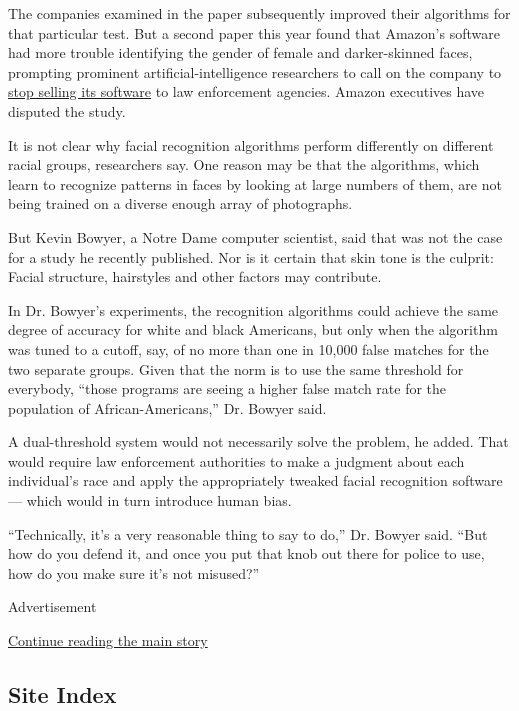 The companies examined in the paper subsequently improved their
algorithms for that particular test. But a second paper this year found
that Amazon's software had more trouble identifying the gender of female
and darker-skinned faces, prompting prominent artificial-intelligence
researchers to call on the company to
\href{https://www.nytimes.com/2019/04/03/technology/amazon-facial-recognition-technology.html}{stop
selling its software} to law enforcement agencies. Amazon executives
have disputed the study.

It is not clear why facial recognition algorithms perform differently on
different racial groups, researchers say. One reason may be that the
algorithms, which learn to recognize patterns in faces by looking at
large numbers of them, are not being trained on a diverse enough array
of photographs.

But Kevin Bowyer, a Notre Dame computer scientist, said that was not the
case for a study he recently published. Nor is it certain that skin tone
is the culprit: Facial structure, hairstyles and other factors may
contribute.

In Dr. Bowyer's experiments, the recognition algorithms could achieve
the same degree of accuracy for white and black Americans, but only when
the algorithm was tuned to a cutoff, say, of no more than one in 10,000
false matches for the two separate groups. Given that the norm is to use
the same threshold for everybody, ``those programs are seeing a higher
false match rate for the population of African-Americans,'' Dr. Bowyer
said.

A dual-threshold system would not necessarily solve the problem, he
added. That would require law enforcement authorities to make a judgment
about each individual's race and apply the appropriately tweaked facial
recognition software --- which would in turn introduce human bias.

``Technically, it's a very reasonable thing to say to do,'' Dr. Bowyer
said. ``But how do you defend it, and once you put that knob out there
for police to use, how do you make sure it's not misused?''

Advertisement

\protect\hyperlink{after-bottom}{Continue reading the main story}

\hypertarget{site-index}{%
\subsection{Site Index}\label{site-index}}

